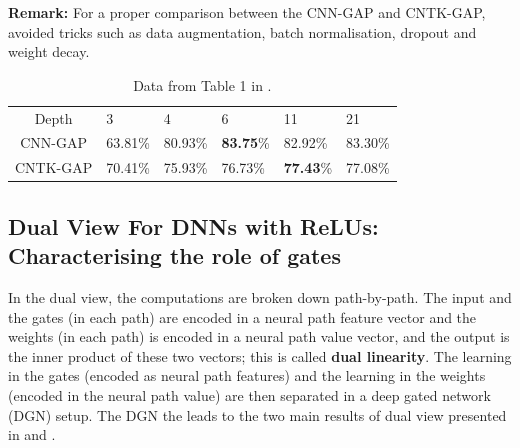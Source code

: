 \textbf{Remark:} For a proper comparison between the  CNN-GAP and CNTK-GAP, \cite{arora2019exact} avoided tricks such as data augmentation, batch normalisation, dropout and weight decay.
\begin{table}
\begin{tabularx}{\columnwidth}{c *{5}{Y}}
\toprule 
Depth & 3 & 4 & 6&11 &21\\
CNN-GAP &63.81\% &80.93\% & \textbf{83.75}\% & 82.92\% & 83.30\%\\
CNTK-GAP &70.41\% &75.93\% & 76.73\% & \textbf{77.43}\% & 77.08\%\\
\bottomrule
\end{tabularx}
\caption{Data from Table 1 in \citep{arora2019exact}.}
\label{tb:cntk-cnn}
\end{table}



\subsection{Dual View For DNNs with ReLUs: Characterising the role of gates}

In the dual view, the computations are broken down path-by-path. The input and the gates (in each path) are encoded in a neural path feature vector and the weights (in each path) is encoded in a neural path value vector, and the output is the inner product of these two vectors; this is called \textbf{dual linearity}.  The learning in the gates (encoded as neural path features) and the learning in the weights (encoded in the neural path value) are then separated in a deep gated network (DGN) setup. The DGN the leads to the two main results of dual view presented in  and .


